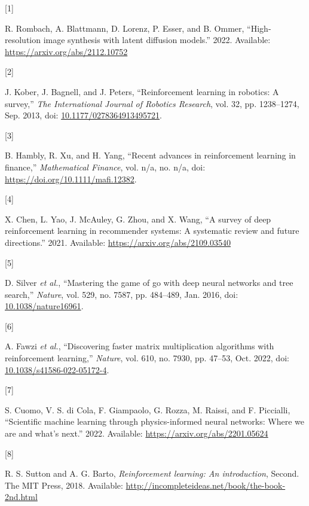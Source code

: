 \documentclass[
  letterpaper,
]{report}
\newlength{\cslhangindent}
\newlength{\csllabelwidth}
\newenvironment{CSLReferences}[2] %
 {\begin{list}{}{%
  \setlength{\itemindent}{0pt}
  \setlength{\leftmargin}{0pt}
  \setlength{\parsep}{0pt}
  \ifodd #1
   \setlength{\leftmargin}{\cslhangindent}
   \setlength{\itemindent}{-1\cslhangindent}
  \fi
  \setlength{\itemsep}{#2\baselineskip}}}
 {\end{list}}
\newcommand{\CSLLeftMargin}[1]{\parbox[t]{\csllabelwidth}{\strut#1\strut}}
\newcommand{\CSLRightInline}[1]{\parbox[t]{\linewidth - \csllabelwidth}{\strut#1\strut}}
\theoremstyle{definition}
\theoremstyle{plain}
\theoremstyle{definition}
\theoremstyle{remark}
\begin{document}
\label{refs}
\begin{CSLReferences}{0}{0}
\CSLLeftMargin{{[}1{]} }%
\CSLRightInline{R. Rombach, A. Blattmann, D. Lorenz, P. Esser, and B.
Ommer, {``High-resolution image synthesis with latent diffusion
models.''} 2022. Available: \url{https://arxiv.org/abs/2112.10752}}

\CSLLeftMargin{{[}2{]} }%
\CSLRightInline{J. Kober, J. Bagnell, and J. Peters, {``Reinforcement
learning in robotics: A survey,''} \emph{The International Journal of
Robotics Research}, vol. 32, pp. 1238--1274, Sep. 2013, doi:
\href{https://doi.org/10.1177/0278364913495721}{10.1177/0278364913495721}.}

\CSLLeftMargin{{[}3{]} }%
\CSLRightInline{B. Hambly, R. Xu, and H. Yang, {``Recent advances in
reinforcement learning in finance,''} \emph{Mathematical Finance}, vol.
n/a, no. n/a, doi: \url{https://doi.org/10.1111/mafi.12382}.}

\CSLLeftMargin{{[}4{]} }%
\CSLRightInline{X. Chen, L. Yao, J. McAuley, G. Zhou, and X. Wang, {``A
survey of deep reinforcement learning in recommender systems: A
systematic review and future directions.''} 2021. Available:
\url{https://arxiv.org/abs/2109.03540}}

\CSLLeftMargin{{[}5{]} }%
\CSLRightInline{D. Silver \emph{et al.}, {``Mastering the game of go
with deep neural networks and tree search,''} \emph{Nature}, vol. 529,
no. 7587, pp. 484--489, Jan. 2016, doi:
\href{https://doi.org/10.1038/nature16961}{10.1038/nature16961}.}

\CSLLeftMargin{{[}6{]} }%
\CSLRightInline{A. Fawzi \emph{et al.}, {``Discovering faster matrix
multiplication algorithms with reinforcement learning,''} \emph{Nature},
vol. 610, no. 7930, pp. 47--53, Oct. 2022, doi:
\href{https://doi.org/10.1038/s41586-022-05172-4}{10.1038/s41586-022-05172-4}.}

\CSLLeftMargin{{[}7{]} }%
\CSLRightInline{S. Cuomo, V. S. di Cola, F. Giampaolo, G. Rozza, M.
Raissi, and F. Piccialli, {``Scientific machine learning through
physics-informed neural networks: Where we are and what's next.''} 2022.
Available: \url{https://arxiv.org/abs/2201.05624}}

\CSLLeftMargin{{[}8{]} }%
\CSLRightInline{R. S. Sutton and A. G. Barto, \emph{Reinforcement
learning: An introduction}, Second. The MIT Press, 2018. Available:
\url{http://incompleteideas.net/book/the-book-2nd.html}}


\end{CSLReferences}
\end{document}
